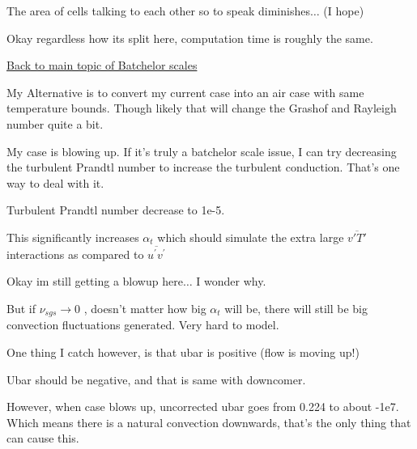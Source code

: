 \documentclass[12pt]{article}
\renewcommand{\_}{\kern-1.5pt\textunderscore\kern-1.5pt}
\begin{document}

\par

The area of cells talking to each other so to speak diminishes$ \ldots $  (I hope)\par

Okay regardless how its split here, computation time is roughly the same.\par


\vspace{\baselineskip}
\uline{Back to main topic of Batchelor scales}\par

My Alternative is to convert my current case into an air case with same temperature bounds. Though likely that will change the Grashof and Rayleigh number quite a bit. \par

\vspace{\baselineskip}
My case is blowing up. If it’s truly a batchelor scale issue, I can try decreasing the turbulent Prandtl number to increase the turbulent conduction. That’s one way to deal with it.\par

Turbulent Prandtl number decrease to 1e-5.\par

This significantly increases  \(  \alpha _{t} \)  which should simulate the extra large   \( \overline{v'T'} \)  interactions as compared to   \( \overline{u^{'}v^{'}} \) \par

Okay im still getting a blowup here$ \ldots $  I wonder why.\par

But if  \(  \nu _{sgs} \rightarrow 0 \) , doesn’t matter how big  \(  \alpha _{t} \)  will be, there will still be big convection fluctuations generated. Very hard to model.\par


\vspace{\baselineskip}
One thing I catch however, is that ubar is positive (flow is moving up!)\par

Ubar should be negative, and that is same with downcomer. \par

However, when case blows up, uncorrected ubar goes from 0.224 to about -1e7. Which means there is a natural convection downwards, that’s the only thing that can cause this.\par
\end{document}
